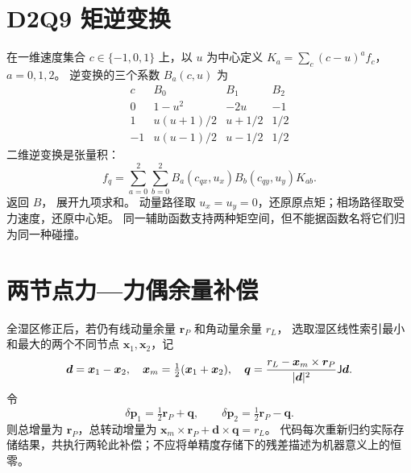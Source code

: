 \section{D2Q9 矩逆变换}
\label{app:inverse}
在一维速度集合 $c\in\{-1,0,1\}$ 上，以 $u$ 为中心定义
$K_a=\sum_c(c-u)^a f_c$，$a=0,1,2$。
逆变换的三个系数 $B_a(c,u)$ 为
\begin{equation}
\begin{array}{c|ccc}
 c&B_0&B_1&B_2\\\hline
 0&1-u^2&-2u&-1\\
 1&u(u+1)/2&u+1/2&1/2\\
 -1&u(u-1)/2&u-1/2&1/2
\end{array}
\end{equation}
二维逆变换是张量积：
\begin{equation}
 f_q=\sum_{a=0}^2\sum_{b=0}^2
 B_a(c_{qx},u_x)B_b(c_{qy},u_y)K_{ab}.
\end{equation}
 返回 $B$，
 展开九项求和。
动量路径取 $u_x=u_y=0$，还原原点矩；相场路径取受力速度，还原中心矩。
同一辅助函数支持两种矩空间，但不能据函数名将它们归为同一种碰撞。

\section{两节点力—力偶余量补偿}
全湿区修正后，若仍有线动量余量 $\bm r_P$ 和角动量余量 $r_L$，
选取湿区线性索引最小和最大的两个不同节点 $\bm x_1,\bm x_2$，记
\begin{equation}
 \bm d=\bm x_1-\bm x_2,\quad\bm x_m=\tfrac12(\bm x_1+\bm x_2),\quad
 \bm q=\frac{r_L-\bm x_m\times\bm r_P}{|\bm d|^2}\mathsf J\bm d.
\end{equation}
令
\begin{equation}
 \delta\bm p_1=\tfrac12\bm r_P+\bm q,\qquad
 \delta\bm p_2=\tfrac12\bm r_P-\bm q.
\end{equation}
则总增量为 $\bm r_P$，总转动增量为
$\bm x_m\times\bm r_P+\bm d\times\bm q=r_L$。
代码每次重新归约实际存储结果，共执行两轮此补偿；不应将单精度存储下的残差描述为机器意义上的恒零。

